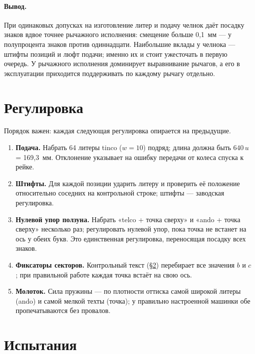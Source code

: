 \paragraph{Вывод.} При одинаковых допусках на изготовление литер и подачу челнок даёт посадку знаков вдвое точнее рычажного исполнения: смещение больше 0,1~мм — у полупроцента знаков против одиннадцати. Наибольшие вклады у челнока — штифты позиций и люфт подачи; именно их и стоит ужесточать в первую очередь. У рычажного исполнения доминирует выравнивание рычагов, а его в эксплуатации приходится поддерживать по каждому рычагу отдельно.

\section{Регулировка}

Порядок важен: каждая следующая регулировка опирается на предыдущие.

\begin{enumerate}
  \item \textbf{Подача.} Набрать 64 литеры tinco ($w = 10$) подряд; длина должна быть $640\,u$ = 169,3~мм. Отклонение указывает на ошибку передачи от колеса спуска к рейке.
  \item \textbf{Штифты.} Для каждой позиции ударить литеру и проверить её положение относительно соседних на контрольной строке; штифты — заводская регулировка.
  \item \textbf{Нулевой упор ползуна.} Набрать «telco + точка сверху» и «ando + точка сверху» несколько раз; регулировать нулевой упор, пока точка не встанет на ось у обеих букв. Это единственная регулировка, переносящая посадку всех знаков.
  \item \textbf{Фиксаторы секторов.} Контрольный текст (\S\ref{sec:tests}) перебирает все значения $b$ и $c$; при правильной работе каждая точка встаёт на свою ось.
  \item \textbf{Молоток.} Сила пружины — по плотности оттиска самой широкой литеры (ando) и самой мелкой техты (точка); у правильно настроенной машинки обе пропечатываются без провалов.
\end{enumerate}

\section{Испытания}
\label{sec:tests}

